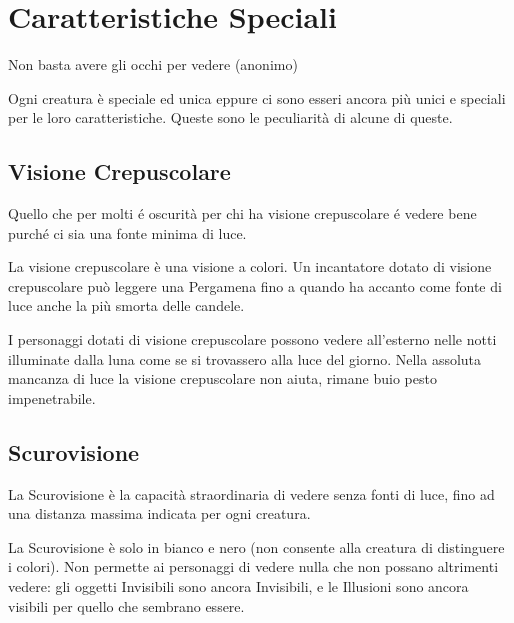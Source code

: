 \section{Caratteristiche Speciali}


\begin{changemargin}{0.3cm}{0.3cm}\begin{enfasi}{
\begin{center}
Non basta avere gli occhi per vedere (anonimo)
\end{center}
}\end{enfasi}\end{changemargin}\medskip

\begin{multicols}{2}


Ogni creatura è speciale ed unica eppure ci sono esseri ancora più unici e speciali per le loro caratteristiche. Queste sono le peculiarità di alcune di queste.

\subsection{Visione Crepuscolare}\label{visionecrepuscolare}

Quello che per molti é oscurità per chi ha \hypertarget{visionecrepuscolare}{visione crepuscolare} é vedere bene purché ci sia una fonte minima di luce.

La visione crepuscolare è una visione a colori.
Un incantatore dotato di visione crepuscolare può leggere una Pergamena fino a quando ha accanto come fonte di luce anche la più smorta delle candele.

I personaggi dotati di visione crepuscolare possono vedere all'esterno nelle notti illuminate dalla luna come se si trovassero alla luce del giorno.
Nella assoluta mancanza di luce la visione crepuscolare non aiuta, rimane buio pesto impenetrabile.

\subsection{Scurovisione}\label{scurovisione}

La Scurovisione è la capacità straordinaria di vedere senza fonti di luce, fino ad una distanza massima indicata per ogni creatura.

La Scurovisione è solo in bianco e nero (non consente alla creatura di distinguere i colori). Non permette ai personaggi di vedere nulla che non possano altrimenti vedere: gli oggetti Invisibili sono ancora Invisibili, e le Illusioni sono ancora visibili per quello che sembrano essere.


\end{multicols}
